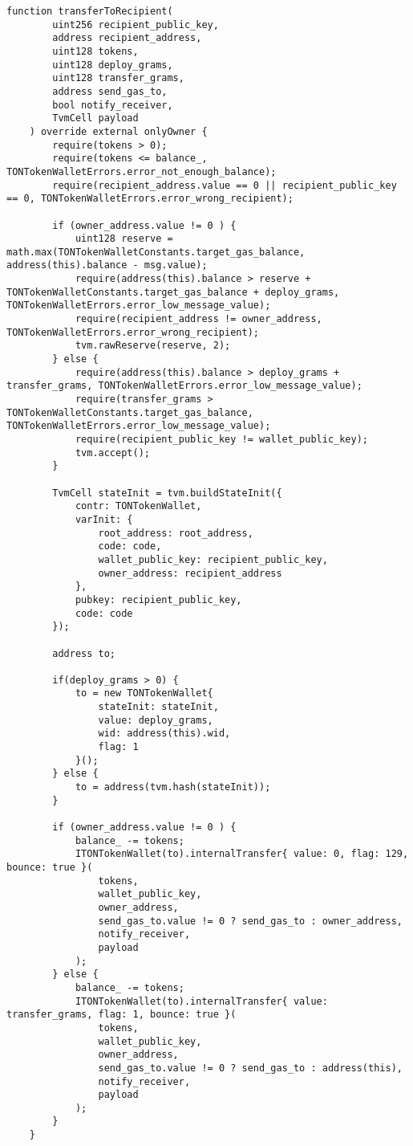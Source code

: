 \begin{lstlisting}[firstnumber=177]
    function transferToRecipient(
        uint256 recipient_public_key,
        address recipient_address,
        uint128 tokens,
        uint128 deploy_grams,
        uint128 transfer_grams,
        address send_gas_to,
        bool notify_receiver,
        TvmCell payload
    ) override external onlyOwner {
        require(tokens > 0);
        require(tokens <= balance_, TONTokenWalletErrors.error_not_enough_balance);
        require(recipient_address.value == 0 || recipient_public_key == 0, TONTokenWalletErrors.error_wrong_recipient);

        if (owner_address.value != 0 ) {
            uint128 reserve = math.max(TONTokenWalletConstants.target_gas_balance, address(this).balance - msg.value);
            require(address(this).balance > reserve + TONTokenWalletConstants.target_gas_balance + deploy_grams, TONTokenWalletErrors.error_low_message_value);
            require(recipient_address != owner_address, TONTokenWalletErrors.error_wrong_recipient);
            tvm.rawReserve(reserve, 2);
        } else {
            require(address(this).balance > deploy_grams + transfer_grams, TONTokenWalletErrors.error_low_message_value);
            require(transfer_grams > TONTokenWalletConstants.target_gas_balance, TONTokenWalletErrors.error_low_message_value);
            require(recipient_public_key != wallet_public_key);
            tvm.accept();
        }

        TvmCell stateInit = tvm.buildStateInit({
            contr: TONTokenWallet,
            varInit: {
                root_address: root_address,
                code: code,
                wallet_public_key: recipient_public_key,
                owner_address: recipient_address
            },
            pubkey: recipient_public_key,
            code: code
        });

        address to;

        if(deploy_grams > 0) {
            to = new TONTokenWallet{
                stateInit: stateInit,
                value: deploy_grams,
                wid: address(this).wid,
                flag: 1
            }();
        } else {
            to = address(tvm.hash(stateInit));
        }

        if (owner_address.value != 0 ) {
            balance_ -= tokens;
            ITONTokenWallet(to).internalTransfer{ value: 0, flag: 129, bounce: true }(
                tokens,
                wallet_public_key,
                owner_address,
                send_gas_to.value != 0 ? send_gas_to : owner_address,
                notify_receiver,
                payload
            );
        } else {
            balance_ -= tokens;
            ITONTokenWallet(to).internalTransfer{ value: transfer_grams, flag: 1, bounce: true }(
                tokens,
                wallet_public_key,
                owner_address,
                send_gas_to.value != 0 ? send_gas_to : address(this),
                notify_receiver,
                payload
            );
        }
    }
\end{lstlisting}
